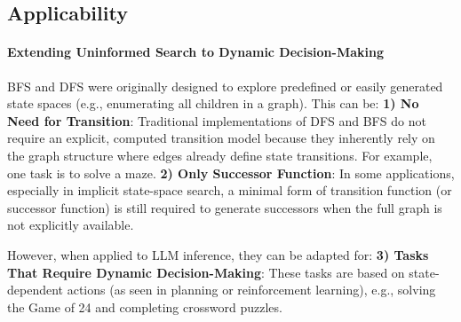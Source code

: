 \paragraph{}


\subsection{Applicability}

\paragraph{Extending Uninformed Search to Dynamic Decision-Making}
BFS and DFS were originally designed to explore predefined or easily generated state spaces (e.g., enumerating all children in a graph). This can be: \textbf{1) No Need for Transition}: Traditional implementations of DFS and BFS do not require an explicit, computed transition model because they inherently rely on the graph structure where edges already define state transitions. For example, one task is to solve a maze.
\textbf{2) Only Successor Function}: In some applications, especially in implicit state-space search, a minimal form of transition function (or successor function) is still required to generate successors when the full graph is not explicitly available. 

However, when applied to LLM inference, they can be adapted for:
\textbf{3) Tasks That Require Dynamic Decision-Making}: These tasks are based on state-dependent actions (as seen in planning or reinforcement learning), e.g., solving the Game of 24 and completing crossword puzzles.

